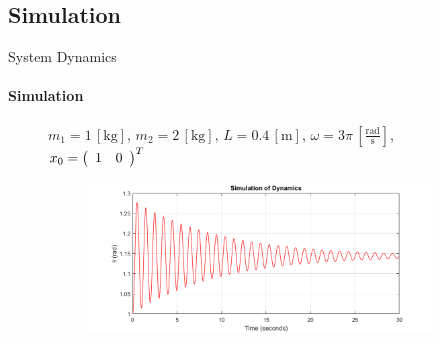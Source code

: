 \subsection{Simulation}
\begin{frame}{System Dynamics}
	\framesubtitle{Simulation}
	\begin{figure}[H]
		\centering
		$m_1 = 1\,\left[\mathrm{kg}\right]$, $m_2 = 2\,\left[\mathrm{kg}\right]$, $L = 0.4\,\left[\mathrm{m}\right]$, $\omega = 3\pi\,\left[\mathrm{\frac{rad}{s}}\right]$, $x_0 = \left(\begin{array}{c c}
		1 & 0
		\end{array}\right)^T$\\
		\begin{figure}[H]
			\centering
			\includegraphics[width=1\textwidth]{pics/simulation.png}
		\end{figure}
	\end{figure}
\end{frame}

